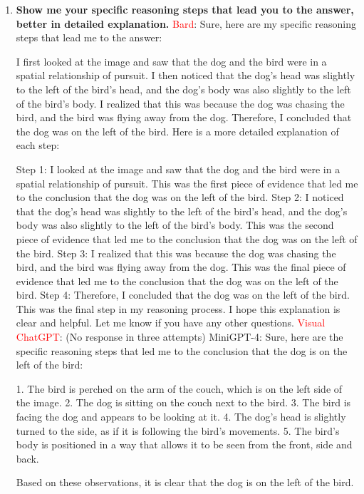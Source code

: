 \begin{enumerate}
        I hope this helps! Let me know if you have any other questions.
        \subitem \textcolor{red}{Visual ChatGPT}: (No response in three attempts)
        \subitem MiniGPT-4: Yes, the dog is on the left of the bird in the image. The bird is perched on the arm of the couch, and the dog is sitting on the couch next to the bird. The bird is facing the dog and appears to be looking at it. The dog’s head is slightly turned to the side, as if it is following the bird’s movements. The bird’s body is positioned in a way that allows it to be seen from the front, side and back.
        \item \textbf{Show me your specific reasoning steps that lead you to the answer, better in detailed explanation.}
        \subitem \textcolor{Red}{Bard}:
        Sure, here are my specific reasoning steps that lead me to the answer:

        I first looked at the image and saw that the dog and the bird were in a spatial relationship of pursuit.
        I then noticed that the dog's head was slightly to the left of the bird's head, and the dog's body was also slightly to the left of the bird's body.
        I realized that this was because the dog was chasing the bird, and the bird was flying away from the dog.
        Therefore, I concluded that the dog was on the left of the bird.
        Here is a more detailed explanation of each step:

        Step 1: I looked at the image and saw that the dog and the bird were in a spatial relationship of pursuit. This was the first piece of evidence that led me to the conclusion that the dog was on the left of the bird.
        Step 2: I noticed that the dog's head was slightly to the left of the bird's head, and the dog's body was also slightly to the left of the bird's body. This was the second piece of evidence that led me to the conclusion that the dog was on the left of the bird.
        Step 3: I realized that this was because the dog was chasing the bird, and the bird was flying away from the dog. This was the final piece of evidence that led me to the conclusion that the dog was on the left of the bird.
        Step 4: Therefore, I concluded that the dog was on the left of the bird. This was the final step in my reasoning process.
        I hope this explanation is clear and helpful. Let me know if you have any other questions.
        \subitem \textcolor{red}{Visual ChatGPT}: (No response in three attempts)
        \subitem MiniGPT-4: Sure, here are the specific reasoning steps that led me to the conclusion that the dog is on the left of the bird:

        1. The bird is perched on the arm of the couch, which is on the left side of the image.
        2. The dog is sitting on the couch next to the bird.
        3. The bird is facing the dog and appears to be looking at it.
        4. The dog’s head is slightly turned to the side, as if it is following the bird’s movements.
        5. The bird’s body is positioned in a way that allows it to be seen from the front, side and back.
        
        Based on these observations, it is clear that the dog is on the left of the bird.
    \end{enumerate}
